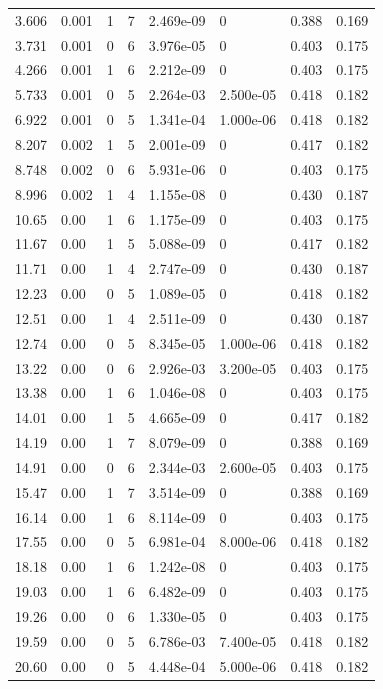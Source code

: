 \documentclass[preview]{standalone}
\begin{document}
{{\begin{tabular}{L{1.2cm}C{1.2cm} C{0.3cm}C{0.5cm} C{1.4cm}C{1.4cm} C{1.4cm}C{1.4cm}}
  3.606  &  0.001  & 1     &  7 &  2.469e-09  & 0  & 0.388 &  0.169   \\ 
  3.731  &  0.001  & 0     &  6 &  3.976e-05  & 0  & 0.403 &  0.175   \\ 
  4.266  &  0.001  & 1     &  6 &  2.212e-09  & 0  & 0.403 &  0.175   \\ 
  5.733  &  0.001  & 0     &  5 &  2.264e-03  & 2.500e-05  & 0.418 &  0.182   \\ 
  6.922  &  0.001  & 0     &  5 &  1.341e-04  & 1.000e-06  & 0.418 &  0.182   \\ 
  8.207  &  0.002  & 1     &  5 &  2.001e-09  & 0  & 0.417 &  0.182   \\ 
  8.748  &  0.002  & 0     &  6 &  5.931e-06  & 0  & 0.403 &  0.175   \\ 
  8.996  &  0.002  & 1     &  4 &  1.155e-08  & 0  & 0.430 &  0.187   \\ 
  10.65  &  0.00  & 1     &  6 &  1.175e-09  & 0  & 0.403 &  0.175   \\ 
  11.67  &  0.00  & 1     &  5 &  5.088e-09  & 0  & 0.417 &  0.182   \\ 
  11.71  &  0.00  & 1     &  4 &  2.747e-09  & 0  & 0.430 &  0.187   \\ 
  12.23  &  0.00  & 0     &  5 &  1.089e-05  & 0  & 0.418 &  0.182   \\ 
  12.51  &  0.00  & 1     &  4 &  2.511e-09  & 0  & 0.430 &  0.187   \\ 
  12.74  &  0.00  & 0     &  5 &  8.345e-05  & 1.000e-06  & 0.418 &  0.182   \\ 
  13.22  &  0.00  & 0     &  6 &  2.926e-03  & 3.200e-05  & 0.403 &  0.175   \\ 
  13.38  &  0.00  & 1     &  6 &  1.046e-08  & 0  & 0.403 &  0.175   \\ 
  14.01  &  0.00  & 1     &  5 &  4.665e-09  & 0  & 0.417 &  0.182   \\ 
  14.19  &  0.00  & 1     &  7 &  8.079e-09  & 0  & 0.388 &  0.169   \\ 
  14.91  &  0.00  & 0     &  6 &  2.344e-03  & 2.600e-05  & 0.403 &  0.175   \\ 
  15.47  &  0.00  & 1     &  7 &  3.514e-09  & 0  & 0.388 &  0.169   \\ 
  16.14  &  0.00  & 1     &  6 &  8.114e-09  & 0  & 0.403 &  0.175   \\ 
  17.55  &  0.00  & 0     &  5 &  6.981e-04  & 8.000e-06  & 0.418 &  0.182   \\ 
  18.18  &  0.00  & 1     &  6 &  1.242e-08  & 0  & 0.403 &  0.175   \\ 
  19.03  &  0.00  & 1     &  6 &  6.482e-09  & 0  & 0.403 &  0.175   \\ 
  19.26  &  0.00  & 0     &  6 &  1.330e-05  & 0  & 0.403 &  0.175   \\ 
  19.59  &  0.00  & 0     &  5 &  6.786e-03  & 7.400e-05  & 0.418 &  0.182   \\ 
  20.60  &  0.00  & 0     &  5 &  4.448e-04  & 5.000e-06  & 0.418 &  0.182   \\ 
\hline 
\end{tabular} 

}}
\end{document}
